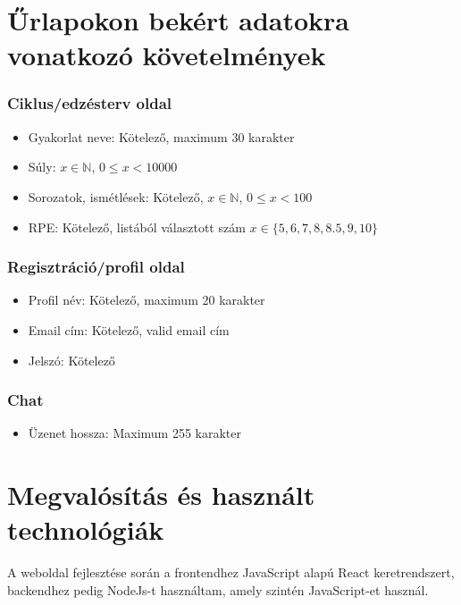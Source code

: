 \section{Űrlapokon bekért adatokra vonatkozó követelmények}

\subsubsection{Ciklus/edzésterv oldal}

\begin{itemize}
	\item Gyakorlat neve: Kötelező, maximum 30 karakter
	\item Súly: $x \in \mathbb{N}$, $0 \leq x < 10000$
	\item Sorozatok, ismétlések: Kötelező, $x \in \mathbb{N}$, $0 \leq x < 100$
	\item RPE: Kötelező, listából választott szám $x \in \{5, 6, 7, 8, 8.5, 9, 10\}$
\end{itemize}

\subsubsection{Regisztráció/profil oldal}

\begin{itemize}
	\item Profil név: Kötelező, maximum 20 karakter
	\item Email cím: Kötelező, valid email cím
	\item Jelszó: Kötelező
\end{itemize}

\subsubsection{Chat}

\begin{itemize}
	\item Üzenet hossza: Maximum 255 karakter
\end{itemize}

\pagebreak

\section{Megvalósítás és használt technológiák}

A weboldal fejlesztése során a frontendhez JavaScript alapú React \cite{react} keretrendszert, backendhez pedig NodeJs-t \cite{nodejs} használtam, amely szintén JavaScript-et használ.

